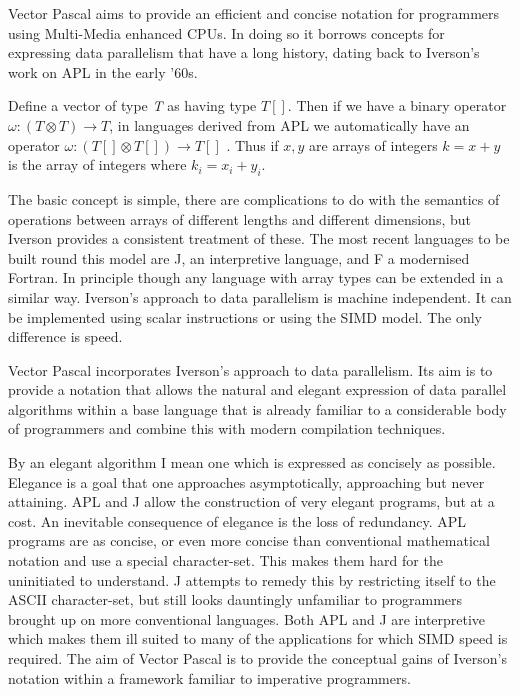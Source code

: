 Vector Pascal aims to provide an efficient and concise notation for programmers
using Multi-Media enhanced CPUs. In doing so it borrows concepts for expressing
data parallelism that have a long history, dating back to Iverson's work on
APL in the early '60s\cite{Iverson62}. 

Define a vector of type \emph{T} as having type \( T[] \). Then if we have
a binary operator \( \omega :(T\otimes T)\rightarrow T \), in languages derived
from APL we automatically have an operator \( \omega :(T[]\otimes T[])\rightarrow T[] \)
\(  \). Thus if \( x,y \) are arrays of integers \( k=x+y \) is the array
of integers where \( k_{i}=x_{i}+y_{i} \).

The basic concept is simple, there are complications to do with the semantics
of operations between arrays of different lengths and different dimensions,
but Iverson provides a consistent treatment of these. The most recent languages
to be built round this model are J, an interpretive language\cite{Jmanual}\cite{Burke}\cite{Jintro},
and F\cite{Metcalf96} a modernised Fortran. In principle though
any language with array types can be extended in a similar way. Iverson's approach
to data parallelism is machine independent. It can be implemented using scalar
instructions or using the SIMD model. The only difference is speed. 

Vector Pascal incorporates Iverson's approach to data parallelism. Its aim is
to provide a notation that allows the natural and elegant expression of data
parallel algorithms within a base language that is already familiar to a considerable
body of programmers and combine this with modern compilation techniques. 

By an elegant algorithm I mean one which is expressed as concisely as possible.
Elegance is a goal that one approaches asymptotically, approaching but never
attaining\cite{Chaitin}. APL and J allow the construction of very elegant programs,
but at a cost. An inevitable consequence of elegance is the loss of redundancy.
APL programs are as concise, or even more concise than conventional mathematical
notation\cite{Iverson80} and use a special character-set. This makes them hard
for the uninitiated to understand. J attempts to remedy this by restricting
itself to the ASCII character-set, but still looks dauntingly unfamiliar to
programmers brought up on more conventional languages. Both APL and J are interpretive
which makes them ill suited to many of the applications for which SIMD speed
is required. The aim of Vector Pascal is to provide the conceptual gains of
Iverson's notation within a framework familiar to imperative programmers.

